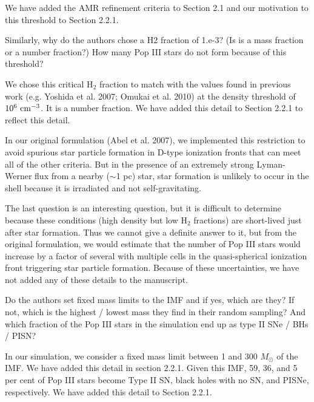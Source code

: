 \documentclass[11pt]{article}
\newenvironment{referee}[1][]{%
    \ignorespaces%
    \begin{mdframed}[style=myquotestyle,#1]%
}{%
    \end{mdframed}%
    \ignorespacesafterend%
}%
\begin{document}
We have added the AMR refinement criteria to Section 2.1 and our motivation to this threshold to Section 2.2.1.

\begin{referee}
Similarly, why do the authors chose a H2 fraction of 1.e-3? (Is is a mass fraction or a number fraction?) How many Pop III stars do not form because of this threshold?
\end{referee}
We chose this critical H$_2$ fraction to match with the values found in previous work (e.g. Yoshida et al. 2007; Omukai et al. 2010) at the density threshold of $10^6~\cubecm$.  It is a number fraction.  We have added this detail to Section 2.2.1 to reflect this detail.

In our original formulation (Abel et al. 2007), we implemented this restriction to avoid spurious star particle formation in D-type ionization fronts that can meet all of the other criteria.  But in the presence of an extremely strong Lyman-Werner flux from a nearby ($\sim$1 pc) star, star formation is unlikely to occur in the shell because it is irradiated and not self-gravitating.

The last question is an interesting question, but it is difficult to determine because these conditions (high density but low H$_2$ fractions) are short-lived just after star formation.  Thus we cannot give a definite answer to it, but from the original formulation, we would estimate that the number of Pop III stars would increase by a factor of several with multiple cells in the quasi-spherical ionization front triggering star particle formation.  Because of these uncertainties, we have not added any of these details to the manuscript.

\begin{referee}
Do the authors set fixed mass limits to the IMF and if yes, which are they?  If not, which is the highest / lowest mass they find in their random sampling?  And which fraction of the Pop III stars in the simulation end up as type II SNe / BHs / PISN?
\end{referee}
In our simulation, we consider a fixed mass limit between 1 and 300 $M_{\odot}$ of the IMF. We have added this detail in section 2.2.1.  Given this IMF, 59, 36, and 5 per cent of Pop III stars become Type II SN, black holes with no SN, and PISNe, respectively. We have added this detail to Section 2.2.1.
\end{document}
